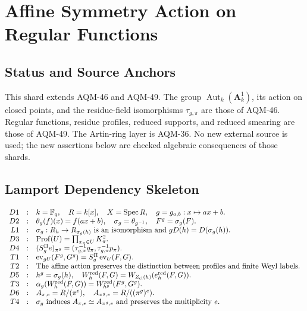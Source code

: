 
\section{Affine Symmetry Action on Regular Functions}
\label{sec:regular-function-affine-symmetry-action}

\subsection{Status and Source Anchors}
This shard extends AQM-46 and AQM-49.  The group
\(\operatorname{Aut}_k(\mathbf A^1_k)\), its action on closed points, and the
residue-field isomorphisms \(\tau_{g,\pi}\) are those of AQM-46.  Regular
functions, residue profiles, reduced supports, and reduced smearing are those
of AQM-49.  The Artin-ring layer is AQM-36.  No new external source is used;
the new assertions below are checked algebraic consequences of those shards.

\subsection{Lamport Dependency Skeleton}
\[
\begin{array}{rcl}
D1&:&k=\mathbb F_q,\quad R=k[x],\quad X=\operatorname{Spec} R,\quad
      g=g_{a,b}:x\mapsto ax+b.\\
D2&:&\theta_g(f)(x)=f(ax+b),\quad
      \sigma_g=\theta_{g^{-1}},\quad F^g=\sigma_g(F).\\
L1&:&\sigma_g:R_h\to R_{\sigma_g(h)}\text{ is an isomorphism and }
      gD(h)=D(\sigma_g(h)).\\
D3&:&\operatorname{Prof}(U)=\prod_{x_\pi\in U}K_\pi^2.\\
D4&:&(S_g^\Pi e)_{\pi^g}=
      (\tau_{g,\pi}^{-1}q_\pi,\tau_{g,\pi}^{-1}p_\pi).\\
T1&:&\operatorname{ev}_{gU}(F^g,G^g)=
      S_g^\Pi\operatorname{ev}_U(F,G).\\
T2&:&\text{The affine action preserves the distinction between profiles and
      finite Weyl labels.}\\
D5&:&h^g=\sigma_g(h),\quad
      W_h^{\rm red}(F,G)=W_{Z_{\rm cl}(h)}(e_h^{\rm red}(F,G)).\\
T3&:&\alpha_g(W_h^{\rm red}(F,G))=
      W_{h^g}^{\rm red}(F^g,G^g).\\
D6&:&A_{\pi,e}=R/(\pi^e),\quad
      A_{\pi^g,e}=R/((\pi^g)^e).\\
T4&:&\sigma_g\text{ induces }A_{\pi,e}\simeq A_{\pi^g,e}
      \text{ and preserves the multiplicity }e.
\end{array}
\]

